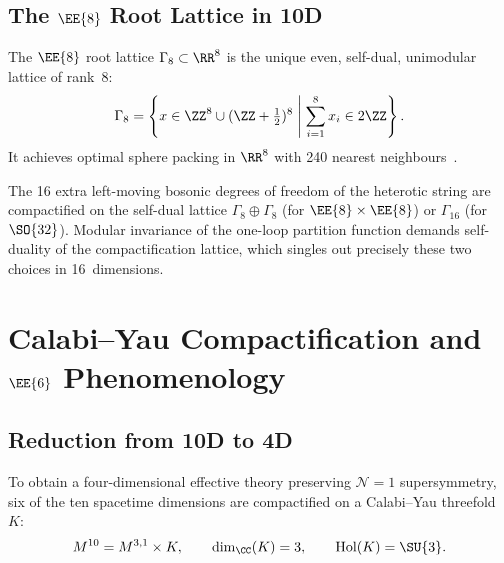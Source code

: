 \subsection{The $\EE{8}$ Root Lattice in 10D}

\begin{definition}[$\EE{8}$ Lattice]
\label{def:e8_lattice}
The $\EE{8}$ root lattice $\Gamma_8 \subset \RR^8$ is the unique even,
self-dual, unimodular lattice of rank~8:
\begin{equation}
\Gamma_8 = \left\{ x \in \ZZ^8 \cup (\ZZ + \tfrac{1}{2})^8 \;\middle|\;
\sum_{i=1}^8 x_i \in 2\ZZ \right\}.
\end{equation}
It achieves optimal sphere packing in $\RR^8$ with 240 nearest
neighbours~\cite{cohn2017sphere}.
\end{definition}

The 16 extra left-moving bosonic degrees of freedom of the heterotic string
are compactified on the self-dual lattice $\Gamma_8 \oplus \Gamma_8$ (for
$\EE{8}\times\EE{8}$) or $\Gamma_{16}$ (for $\SO{32}$).  Modular invariance
of the one-loop partition function demands self-duality of the compactification
lattice, which singles out precisely these two choices in 16~dimensions.

\section{Calabi--Yau Compactification and $\EE{6}$ Phenomenology}
\label{sec:calabi_yau}

\subsection{Reduction from 10D to 4D}

To obtain a four-dimensional effective theory preserving $\mathcal{N}=1$
supersymmetry, six of the ten spacetime dimensions are compactified on a
Calabi--Yau threefold $K$:
\begin{equation}
\label{eq:10d_to_4d}
M^{10} = M^{3,1} \times K, \qquad \dim_\CC(K) = 3, \qquad
\operatorname{Hol}(K) = \SU{3}.
\end{equation}

